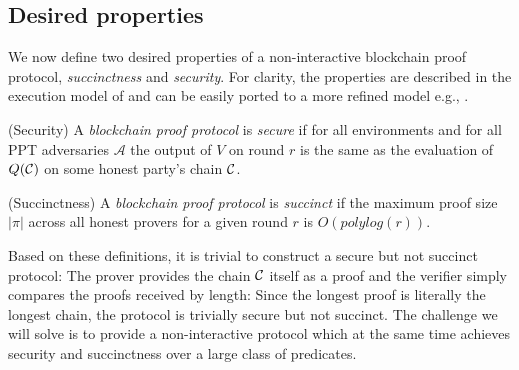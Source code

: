 \subsection{Desired properties}

We now define two desired properties of a non-interactive blockchain proof protocol, \textit{succinctness} and \textit{security}. For clarity, the properties are described in the execution model of \cite{backbone} and can be easily ported to a more refined model e.g., \cite{PSS}.

\begin{definition}{(Security)}
A \textit{blockchain proof protocol} is \textit{secure} if for all environments
and for all PPT adversaries $\mathcal{A}$ the output of $V$ on round $r$ is the
same as the evaluation of $Q(\mathcal{C})$ on some honest party's chain $\mathcal{C}$.
\end{definition}

\begin{definition}{(Succinctness)}
A \textit{blockchain proof protocol} is \textit{succinct} if the maximum proof
size $|\pi|$ across all honest provers for a given round $r$ is
$O(polylog(r))$.
\end{definition}

Based on these definitions, it is trivial to construct a secure but not succinct
protocol: The prover provides the chain $\mathcal{C}$ itself as a proof and the
verifier simply compares the proofs received by length: Since the longest proof
is literally the longest chain, the protocol is trivially secure but not
succinct. The challenge we will solve is to provide a
non-interactive protocol which at the same time achieves security and
succinctness over a large class of predicates.
